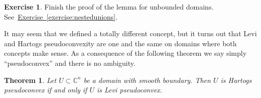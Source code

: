 \documentclass[12pt,openany]{book}
\newcommand{\C}{{\mathbb{C}}}
\theoremstyle{plain}
\newtheorem{thm}{Theorem}[section]
\theoremstyle{remark}
\theoremstyle{definition}
\newenvironment{exbox}{%
    \def\FrameCommand{\vrule width 1pt \relax\hspace{10pt}}%
    \MakeFramed{\advance\hsize-\width\FrameRestore}%
}{%
    \endMakeFramed
}
\theoremstyle{exercise}
\newtheorem{exercise}{Exercise}[section]
\theoremstyle{example}
\newcommand{\exerciseref}[1]{\hyperref[#1]{Exercise~\ref*{#1}}}
\begin{document}
\begin{exbox}
\begin{exercise}
Finish the proof of the lemma for unbounded domains.
See~\exerciseref{exercise:nestedunions}.
\end{exercise}
\end{exbox}



It may seem that we defined a totally different concept, but it turns
out that Levi and Hartogs pseudoconvexity are one and the same on domains
where both concepts make sense.
As a consequence of the following theorem we say simply ``pseudoconvex'' and there
is no ambiguity.

\begin{thm}
Let $U \subset \C^n$ be a domain with smooth boundary. 
Then $U$ is Hartogs pseudoconvex if and only if $U$ is Levi pseudoconvex.
\end{thm}
\end{document}
